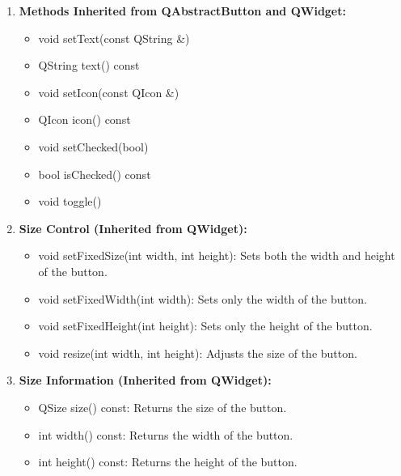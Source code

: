 \documentclass{report}
\begin{document}
\begin{enumerate}
        \item \textbf{Methods Inherited from QAbstractButton and QWidget:}
        \begin{itemize}
            \item void setText(const QString \&)
            \item QString text() const
            \item void setIcon(const QIcon \&)
            \item QIcon icon() const
            \item void setChecked(bool)
            \item bool isChecked() const
            \item void toggle()
        \end{itemize}
        \item \textbf{Size Control (Inherited from QWidget):}
    \begin{itemize}
        \item void setFixedSize(int width, int height): Sets both the width and height of the button.
        \item void setFixedWidth(int width): Sets only the width of the button.
        \item void setFixedHeight(int height): Sets only the height of the button.
        \item void resize(int width, int height): Adjusts the size of the button.
    \end{itemize}

    \item \textbf{Size Information (Inherited from QWidget):}
    \begin{itemize}
        \item QSize size() const: Returns the size of the button.
        \item int width() const: Returns the width of the button.
        \item int height() const: Returns the height of the button.
    \end{itemize}
    \end{enumerate}
\end{document}
